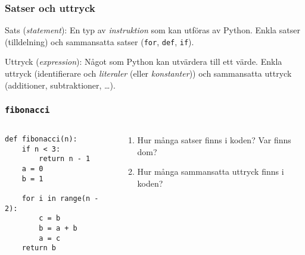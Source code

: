 \documentclass{beamer}
\begin{document}
  \begin{frame}
    \frametitle{Satser och uttryck}

    Sats (\textit{statement}): En typ av \emph{instruktion} som kan utföras av
    Python. Enkla satser (tilldelning) och sammansatta satser (\texttt{for},
    \texttt{def}, \texttt{if}).

    Uttryck (\textit{expression}): Något som Python kan utvärdera till ett
    värde. Enkla uttryck (identifierare och \textit{literaler} (eller
    \textit{konstanter})) och sammansatta uttryck (additioner, subtraktioner,
    \dots).

  \end{frame}

  \begin{frame}[fragile]
    \frametitle{\texttt{fibonacci}}

    \begin{columns}
      \begin{column}{0.48\textwidth}
        \begin{verbatim}
def fibonacci(n):
    if n < 3:
        return n - 1
    a = 0
    b = 1

    for i in range(n - 2):
        c = b
        b = a + b
        a = c
    return b
        \end{verbatim}
      \end{column}%
      \begin{column}{0.48\textwidth}
        \begin{enumerate}
          \item Hur många satser finns i koden? Var finns dom?
          \item Hur många sammansatta uttryck finns i koden?
        \end{enumerate}
      \end{column}%
    \end{columns}
  \end{frame}
\end{document}
